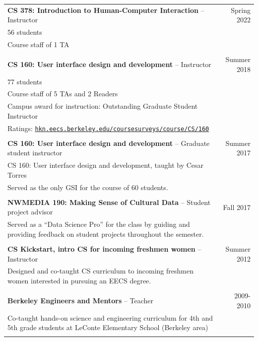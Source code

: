 \begin{longtable}{Xr}
	\textbf{CS 378: Introduction to Human-Computer Interaction} -- Instructor & Spring 2022 \\
	56 students &  \\
	Course staff of 1 TA &  \\
	\\

	\textbf{CS 160: User interface design and development} -- Instructor & Summer 2018 \\
	77 students &  \\
	Course staff of 5 TAs and 2 Readers &  \\
	Campus award for instruction: Outstanding Graduate Student Instructor &  \\
	Ratings: \href{https://hkn.eecs.berkeley.edu/coursesurveys/course/CS/160}{\tt hkn.eecs.berkeley.edu/coursesurveys/course/CS/160} &  \\
	\\

	\textbf{CS 160: User interface design and development} -- Graduate student instructor & Summer 2017 \\
	CS 160: User interface design and development, taught by Cesar Torres &  \\
	Served as the only GSI for the course of 60 students. &  \\
	\\

	\textbf{NWMEDIA 190: Making Sense of Cultural Data} -- Student project advisor & Fall 2017 \\
	Served as a “Data Science Pro” for the class by guiding and providing feedback on student projects throughout the semester. &  \\
	\\

	\textbf{CS Kickstart, intro CS for incoming freshmen women} -- Instructor & Summer 2012 \\
	Designed and co-taught CS curriculum to incoming freshmen women interested in pursuing an EECS degree. &  \\
	\\

	\textbf{Berkeley Engineers and Mentors} -- Teacher & 2009-2010 \\
	Co-taught hands-on science and engineering curriculum for 4th and 5th grade students at LeConte Elementary School (Berkeley area) &  \\
	\\

\end{longtable}